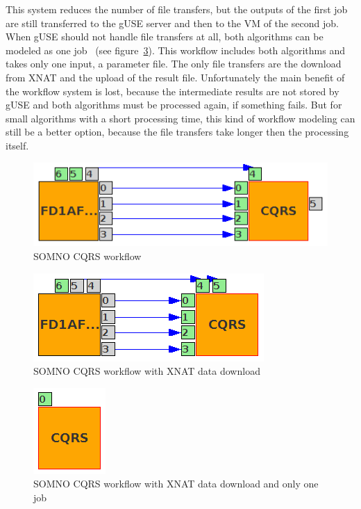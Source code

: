 This system reduces the number of file transfers, but the outputs of the first job are still transferred to the gUSE server and then to the VM of the second job.
When gUSE should not handle file transfers at all, both algorithms can be modeled as one job~\cite{somnocqrsone} (see figure~\ref{fig:CQRSONEworkflow}).
This workflow includes both algorithms and takes only one input, a parameter file.
The only file transfers are the download from XNAT and the upload of the result file.
Unfortunately the main benefit of the workflow system is lost, because the intermediate results are not stored by gUSE and both algorithms must be processed again, if something fails.
But for small algorithms with a short processing time, this kind of workflow modeling can still be a better option, because the file transfers take longer then the processing itself.

\begin{figure}%
                \centering
                \includegraphics[width=1.0\columnwidth]{images/SOMNO_CQRS.png}
                \caption{SOMNO CQRS workflow}
                \label{fig:CQRSworkflow}
\end{figure}

\begin{figure}%
                \centering
                \includegraphics[width=0.8\columnwidth]{images/SOMNO_CQRS_DL_SAMPLE.png}
                \caption{SOMNO CQRS workflow with XNAT data download}
                \label{fig:CQRSDLworkflow}
\end{figure}

\begin{figure}%
                \centering
                \includegraphics[width=0.3\columnwidth]{images/SOMNO_CQRS_ONE_SAMPLE.png}
                \caption{SOMNO CQRS workflow with XNAT data download and only one job}
                \label{fig:CQRSONEworkflow}
\end{figure}